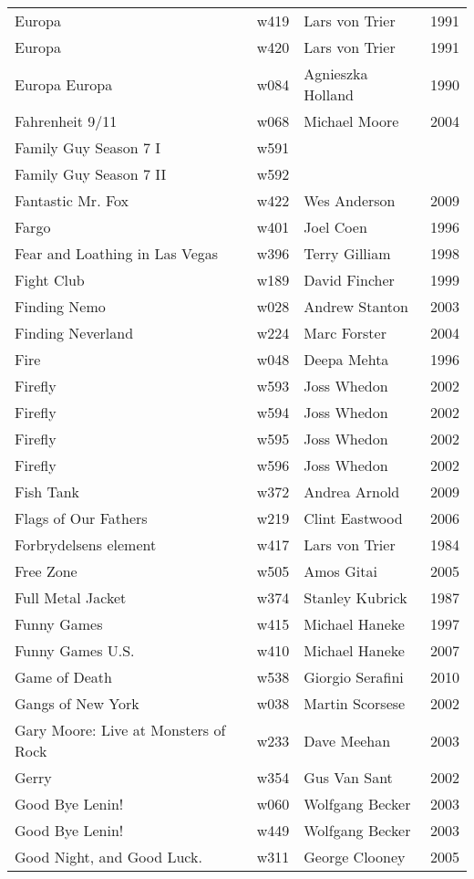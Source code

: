 \documentclass{article}
\begin{document}
\begin {center}
\begin{longtable}{p{10cm} l l l}
Europa & w419 & Lars von Trier & 1991 \\
Europa & w420 & Lars von Trier & 1991 \\
Europa Europa & w084 & Agnieszka Holland & 1990 \\
Fahrenheit 9/11 & w068 & Michael Moore & 2004 \\
Family Guy Season 7 I & w591 &  &  \\
Family Guy Season 7 II & w592 &  &  \\
Fantastic Mr. Fox & w422 & Wes Anderson & 2009 \\
Fargo & w401 & Joel Coen & 1996 \\
Fear and Loathing in Las Vegas & w396 & Terry Gilliam & 1998 \\
Fight Club & w189 & David Fincher & 1999 \\
Finding Nemo & w028 & Andrew Stanton & 2003 \\
Finding Neverland & w224 & Marc Forster & 2004 \\
Fire & w048 & Deepa Mehta & 1996 \\
Firefly & w593 & Joss Whedon & 2002 \\
Firefly & w594 & Joss Whedon & 2002 \\
Firefly & w595 & Joss Whedon & 2002 \\
Firefly & w596 & Joss Whedon & 2002 \\
Fish Tank & w372 & Andrea Arnold & 2009 \\
Flags of Our Fathers & w219 & Clint Eastwood & 2006 \\
Forbrydelsens element & w417 & Lars von Trier & 1984 \\
Free Zone & w505 & Amos Gitai & 2005 \\
Full Metal Jacket & w374 & Stanley Kubrick & 1987 \\
Funny Games & w415 & Michael Haneke & 1997 \\
Funny Games U.S. & w410 & Michael Haneke & 2007 \\
Game of Death & w538 & Giorgio Serafini & 2010 \\
Gangs of New York & w038 & Martin Scorsese & 2002 \\
Gary Moore: Live at Monsters of Rock & w233 & Dave Meehan & 2003 \\
Gerry & w354 & Gus Van Sant & 2002 \\
Good Bye Lenin! & w060 & Wolfgang Becker & 2003 \\
Good Bye Lenin! & w449 & Wolfgang Becker & 2003 \\
Good Night, and Good Luck. & w311 & George Clooney & 2005 \\

\end{longtable}
\end{center}
\end{document}
